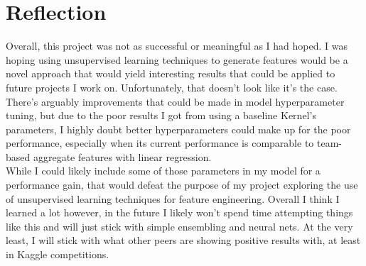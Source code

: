 \documentclass[11pt]{article}
\begin{document}
\section{Reflection}

Overall, this project was not as successful or meaningful as I had hoped. I was hoping using unsupervised learning
techniques to generate features would be a novel approach that would yield interesting results that could be applied
to future projects I work on. Unfortunately, that doesn't look like it's the case. There's arguably improvements that
could be made in model hyperparameter tuning, but due to the poor results I got from using a baseline Kernel's parameters,
I highly doubt better hyperparameters could make up for the poor performance, especially when its current performance is
comparable to team-based aggregate features with linear regression.\cite{feature-engineering}\\

While I could likely include some of those parameters in my model for a performance gain, that would defeat the purpose
of my project exploring the use of unsupervised learning techniques for feature engineering. Overall I think I learned a lot
however, in the future I likely won't spend time attempting things like this and will just stick with simple ensembling and
neural nets. At the very least, I will stick with what other peers are showing positive results with, at least in Kaggle
competitions.

\printbibliography
\end{document}
